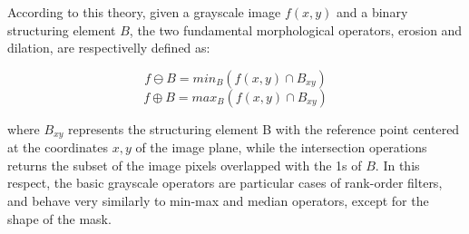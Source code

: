 \documentclass[review]{elsarticle}
\begin{document}
According to this theory, given a grayscale image $f(x,y)$ and a binary structuring element $B$, the two fundamental morphological operators, erosion and dilation, are respectivelly defined as:

\begin{equation} \label{eq:erode}
f \ominus B = min_B(f(x,y) \cap B_{xy})
\end{equation}
\begin{equation} \label{eq:dilate}
f \oplus B = max_B(f(x,y) \cap B_{xy})
\end{equation}


where $B_{xy}$ represents the structuring element B with the reference point centered at the coordinates $x,y$ of the image plane, while the intersection operations returns the subset of the image pixels overlapped with the 1s of $B$. In this respect, the basic grayscale operators are particular cases of rank-order filters, and behave very similarly to min-max and median operators, except for the shape of the mask.
\end{document}
